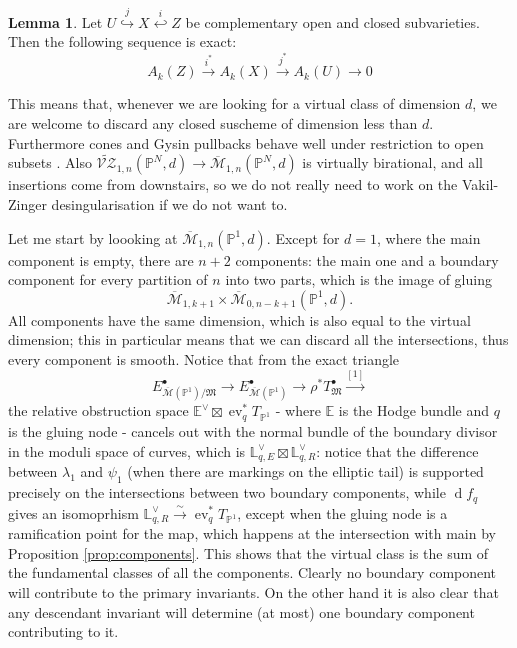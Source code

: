 \documentclass[11pt]{amsart}
\newcommand{\oM}{\overline{\mathcal{M}}}
\newcommand{\M}[4]{\overline{\mathcal{M}}_{#1,#2}(#3,#4)}
\newcommand{\tVZ}[3]{\widetilde{\mathcal{V\!Z}}_{1,#1}(#2,#3)}
\newcommand{\PP}{\mathbb P}
\renewcommand{\to}{\rightarrow}
\newcommand{\MM}{\mathfrak M}
\newcommand{\ev}{\operatorname{ev}}
\theoremstyle{definition}
\newtheorem{lemma}[thm]{Lemma}
\theoremstyle{definition}
\begin{document}
\begin{lemma}\cite[Proposition 1.8]{Ful}
Let $U\overset{j}{\hookrightarrow} X \overset{i}{\hookleftarrow} Z$ be complementary open and closed subvarieties. Then the following sequence is exact:
\[A_k(Z)\overset{i^*}{\to} A_k(X)\overset{j^*}{\to} A_k(U)\to 0\]
\end{lemma}
This means that, whenever we are looking for a virtual class of dimension $d$, we are welcome to discard any closed suscheme of dimension less than $d$. Furthermore cones and Gysin pullbacks behave well under restriction to open subsets \cite[Proposition 4.2(b) and Theorem 6.2(b)]{Ful}. Also $\tVZ{n}{\PP^N}{d}\to \M{1}{n}{\PP^N}{d}$ is virtually birational, and all insertions come from downstairs, so we do not really need to work on the Vakil-Zinger desingularisation if we do not want to.  

Let me start by loooking at $\M{1}{n}{\PP^1}{d}$. Except for $d=1$, where the main component is empty, there are $n+2$ components: the main one and a boundary component for every partition of $n$ into two parts, which is the image of gluing \[\oM_{1,k+1}\times\M{0}{n-k+1}{\PP^1}{d}.\]
All components have the same dimension, which is also equal to the virtual dimension; this in particular means that we can discard all the intersections, thus every component is smooth. Notice that from the exact triangle
\[ E^\bullet_{\oM(\PP^1)/\MM}\to E^\bullet_{\oM(\PP^1)}\to \rho^*T^\bullet_{\MM}\overset{[1]}{\to}\]
the relative obstruction space $\mathbb E^\vee\boxtimes \ev_q^*T_{\PP^1}$ - where $\mathbb E$ is the Hodge bundle and $q$ is the gluing node - cancels out with the normal bundle of the boundary divisor in the moduli space of curves, which is $\mathbb L_{q,E}^\vee\boxtimes \mathbb L_{q,R}^\vee$: notice that the difference between $\lambda_1$ and $\psi_1$ (when there are markings on the elliptic tail) is supported precisely on the intersections between two boundary components, while $\operatorname{d}\!f_q$ gives an isomoprhism $\mathbb L_{q,R}^\vee\xrightarrow{\sim}\ev_q^*T_{\PP^1}$, except when the gluing node is a ramification point for the map, which happens at the intersection with main by Proposition \ref{prop:components}. This shows that the virtual class is the sum of the fundamental classes of all the components. Clearly no boundary component will contribute to the primary invariants. On the other hand it is also clear that any descendant invariant will determine (at most) one boundary component contributing to it.
\end{document}
